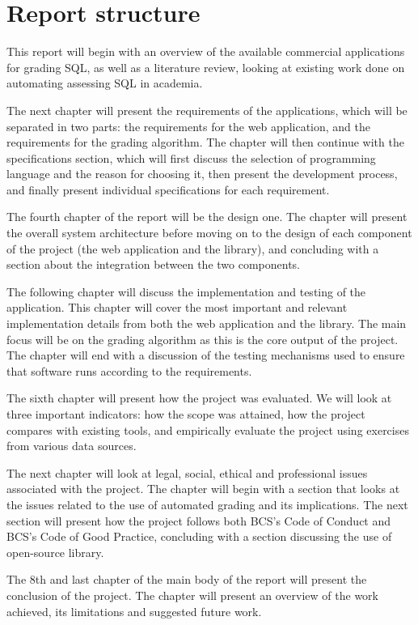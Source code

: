 \section{Report structure}

This report will begin with an overview of the available commercial applications for grading SQL, as well as a literature review, looking at existing work done on automating assessing SQL in academia.

The next chapter will present the requirements of the applications, which will be separated in two parts: the requirements for the web application, and the requirements for the grading algorithm. The chapter will then continue with the specifications section, which will first discuss the selection of programming language and the reason for choosing it, then present the development process, and finally present individual specifications for each requirement.

The fourth chapter of the report will be the design one. The chapter will present the overall system architecture before moving on to the design of each component of the project (the web application and the library), and concluding with a section about the integration between the two components.

The following chapter will discuss the implementation and testing of the application. This chapter will cover the most important and relevant implementation details from both the web application and the library. The main focus will be on the grading algorithm as this is the core output of the project. The chapter will end with a discussion of the testing mechanisms used to ensure that software runs according to the requirements.

The sixth chapter will present how the project was evaluated. We will look at three important indicators: how the scope was attained, how the project compares with existing tools, and empirically evaluate the project using exercises from various data sources.

The next chapter will look at legal, social, ethical and professional issues associated with the project. The chapter will begin with a section that looks at the issues related to the use of automated grading and its implications. The next section will present how the project follows both BCS's Code of Conduct and BCS's Code of Good Practice, concluding with a section discussing the use of open-source library.

The 8th and last chapter of the main body of the report will present the conclusion of the project. The chapter will present an overview of the work achieved, its limitations and suggested future work.